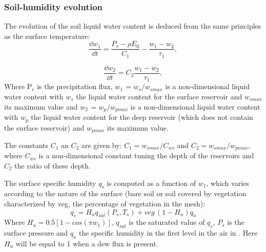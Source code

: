 \subsubsection{Soil-humidity evolution}
The evolution of the soil liquid water content is deduced from the same
principles as the surface temperature:
\begin{equation}
\label{eq23}
\frac{\dd w_{1}}{\dd t}=\frac{P_{r}-\rho E_{0}}{C_{1}}-\frac{w_{1}-w_{2}}{\tau
_{1}},
\end{equation}

\begin{equation}
\label{eq24}
\frac{\dd w_{2}}{\dd t}=C_{2}\frac{w_{1}-w_{2}}{\tau_{1}},
\end{equation}
Where P$_{r}$ is the precipitation flux,
\newline
$w_{1\, }= w_{s}/w_{smax}$ is a non-dimensional liquid water content with $w_{s}$ the liquid water content
for the surface reservoir and $w_{smax}$ its maximum value and
\newline
$w_{2\, }= w_{p}/w_{pmax}$ is a non-dimensional liquid water content with $w_{p}$ the liquid water content
for the deep reservoir (which does not contain the surface reservoir) and $w_{pmax}$ its maximum value.

The constants $C_{1}$ an $C_{2}$ are given by:
\newline
$C_{1}= w_{smax}/C_{ws}$ and $C_{2}=w_{smax}/w_{pmax}$,
\newline
where $C_{ws}$ is a non-dimensional constant tuning
the depth of the reservoirs and $C_{2}$ the ratio of these depth.

The surface specific humidity $q_{s}$ is computed as a function of $w_{1}$,
which varies according to the nature of the surface (bare soil or soil
covered by vegetation characterized by veg, the percentage of vegetation in
the mesh):
\begin{equation}
\label{eq25}
q_{s}=H_{u}q_{sat}\left( P_{s},T_{s} \right)+veg\, \left( 1-H_{u}
\right)q_{a}
\end{equation}
\newline
Where $H_{u}=0.5\left[ 1-cos\left( \pi w_{1} \right) \right]$,
\newline
$q_{sat}$ is the saturated value of $q_{s}$, $P_{s}$ is the surface pressure
\newline
and $q_{a}$ the specific humidity in the first level in the air in \CS.
\newline
Here $H_{u}$ will be equal to 1 when a dew flux is present.

